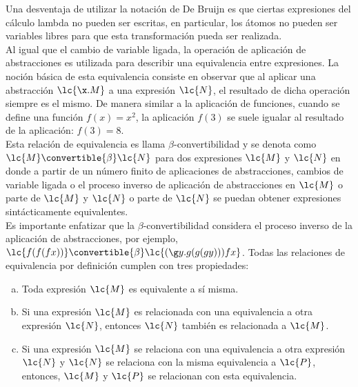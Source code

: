 Una desventaja de utilizar la notación de De Bruijn es que ciertas expresiones
del cálculo lambda no pueden ser escritas, en particular, los átomos no pueden
ser variables libres para que esta transformación pueda ser realizada. \\

Al igual que el cambio de variable ligada, la operación de aplicación de
abstracciones es utilizada para describir una equivalencia entre expresiones. La
noción básica de esta equivalencia consiste en observar que al aplicar una
abstracción \(\lc{\x.M}\) a una expresión \(\lc{N}\), el resultado de dicha
operación siempre es el mismo. De manera similar a la aplicación de funciones,
cuando se define una función \(f(x)=x^{2}\), la aplicación \(f(3)\) se suele
igualar al resultado de la aplicación: \(f(3) = 8\). \\

Esta relación de equivalencia es llama \(\beta\)-convertibilidad y se denota
como \(\lc{M} \convertible{\beta} \lc{N}\) para dos expresiones \(\lc{M}\) y
\(\lc{N}\) en donde a partir de un número finito de aplicaciones de
abstracciones, cambios de variable ligada o el proceso inverso de aplicación de
abstracciones en \(\lc{M}\) o parte de \(\lc{M}\) y \(\lc{N}\) o parte de
\(\lc{N}\) se puedan obtener expresiones sintácticamente equivalentes. \\

Es importante enfatizar que la \(\beta\)-convertibilidad considera el proceso
inverso de la aplicación de abstracciones, por ejemplo, \(\lc{f(f(f x))}
\convertible{\beta} \lc{(\g y.g(g(g y)))f x}\). Todas las relaciones de
equivalencia por definición cumplen con tres propiedades: \\

\begin{enumerate}[a.]
\item Toda expresión \(\lc{M}\) es equivalente a sí misma. \label{relequiv:a}
\item Si una expresión \(\lc{M}\) es relacionada con una equivalencia a otra
  expresión \(\lc{N}\), entonces \(\lc{N}\) también es relacionada a \(\lc{M}\). \label{relequiv:b}
\item Si una expresión \(\lc{M}\) se relaciona con una equivalencia a otra
  expresión \(\lc{N}\) y \(\lc{N}\) se relaciona con la misma equivalencia a
  \(\lc{P}\), entonces, \(\lc{M}\) y \(\lc{P}\) se relacionan con esta
  equivalencia. \label{relequiv:c}
\end{enumerate} \

